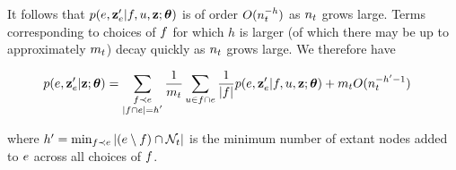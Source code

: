 \documentclass[aps,pre,reprint,superscriptaddress,nofootinbib]{revtex4-2}
\begin{document}
        It follows that $p(e,\mathbf{z}_e' | f, u, \mathbf{z}; \boldsymbol{\theta})$ is of order $O(n_{t}^{-h})$ as $n_{t}$ grows large.
        Terms corresponding to choices of $f$ for which $h$ is larger (of which there may be up to approximately $m_{t}$) decay quickly as $n_{t}$ grows large. 
        We therefore have 
        \begin{widetext}
            \begin{align}
                p(e,\mathbf{z}_e'|\mathbf{z};\boldsymbol{\theta}) &= \sum_{\substack{f \prec e \\ |f \cap e| = h'}} \frac{1}{m_{t}}\sum_{u \in f \cap e} \frac{1}{|f|}  p(e,\mathbf{z}_e' | f, u, \mathbf{z}; \boldsymbol{\theta})  + m_{t}O(n_{t}^{-h'-1}) \label{eq:sa-approx}
            \end{align}
        \end{widetext}
        where $h' = \min_{f \prec e} |(e \setminus f) \cap \mathcal{N}_{t}|$ is the minimum number of extant nodes added to $e$ across all choices of $f$.
        
\end{document}
